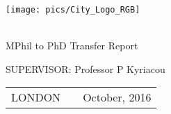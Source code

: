 \thispagestyle{empty}
\setcounter{page}{1}
\begin{titlepage}
    \begin{center}
        \vspace*{2mm}

	    \texttt{[image: pics/City\_Logo\_RGB]} %
	    \vspace{1cm}

        \Large \titulo \\

        \vspace{1cm}
        {\large MPhil to PhD Transfer Report }\\
        \vspace{3cm}

        \vspace{0.3cm}
        \Large
        \autor

        \vspace{0.5cm}
        SUPERVISOR: Professor P Kyriacou\\
        \vspace{2cm}
        \begin{tabular}{lcr}
        LONDON & \hspace{85pt} & October, 2016\\
        \end{tabular}
    \end{center}
{}
\end{titlepage}
\newpage
